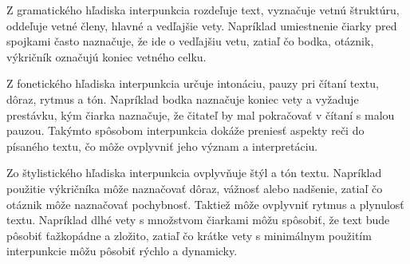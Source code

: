 Z gramatického hľadiska interpunkcia rozdeľuje text, vyznačuje vetnú štruktúru, oddeľuje vetné členy, hlavné a vedľajšie vety.
Napríklad umiestnenie čiarky pred spojkami často naznačuje, že ide o vedľajšiu vetu, zatiaľ čo bodka, otáznik, výkričník označujú koniec vetného celku.

Z fonetického hľadiska interpunkcia určuje intonáciu, pauzy pri čítaní textu, dôraz, rytmus a tón. Napríklad bodka naznačuje koniec vety a vyžaduje prestávku,
kým čiarka naznačuje, že čitateľ by mal pokračovať v čítaní s malou pauzou. Takýmto spôsobom interpunkcia dokáže preniesť aspekty reči do písaného textu,
čo môže ovplyvniť jeho význam a interpretáciu.

Zo štylistického hľadiska interpunkcia ovplyvňuje štýl a tón textu. Napríklad použitie výkričníka môže naznačovať dôraz, vážnosť alebo nadšenie, zatiaľ čo otáznik
môže naznačovať pochybnosť. Taktiež môže ovplyvniť rytmus a plynulosť textu. Napríklad dlhé vety s množstvom čiarkami môžu spôsobiť, že text bude pôsobiť ťažkopádne
a zložito, zatiaľ čo krátke vety s minimálnym použitím interpunkcie môžu pôsobiť rýchlo a dynamicky. 